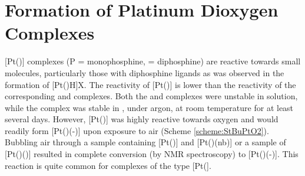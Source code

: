  
\section{Formation of Platinum Dioxygen Complexes}
\label{section:PtO2}

[Pt()] complexes (P = monophosphine,  = diphosphine) are reactive towards small molecules, particularly those with diphosphine ligands as was observed in the formation of [Pt(\tBuxantphos)H]X.\cite{Hackett1988} The reactivity of [Pt(\tButhixantphos)] is lower than the reactivity of the corresponding \tBusixantphos{} and \tBuxantphos{} complexes.  Both the \tBusixantphos{} and \tBuxantphos{} complexes were unstable in solution, while the \tButhixantphos{} complex was stable in , under argon, at room temperature for at least several days.  However, [Pt(\tButhixantphos)] was highly reactive towards oxygen and would readily form [Pt(\tButhixantphos)(-)] upon exposure to air (Scheme \ref{scheme:StBuPtO2}).  Bubbling air through a sample containing [Pt(\tButhixantphos)] and [Pt(\tButhixantphos)(nb)] or a sample of [Pt(\tButhixantphos)()] resulted in complete conversion (by \phosphorus{} NMR spectroscopy) to [Pt(\tButhixantphos)(-)].  This reaction is quite common for complexes of the type [Pt(].\cite{Goel1983b, Yoshida1977}

